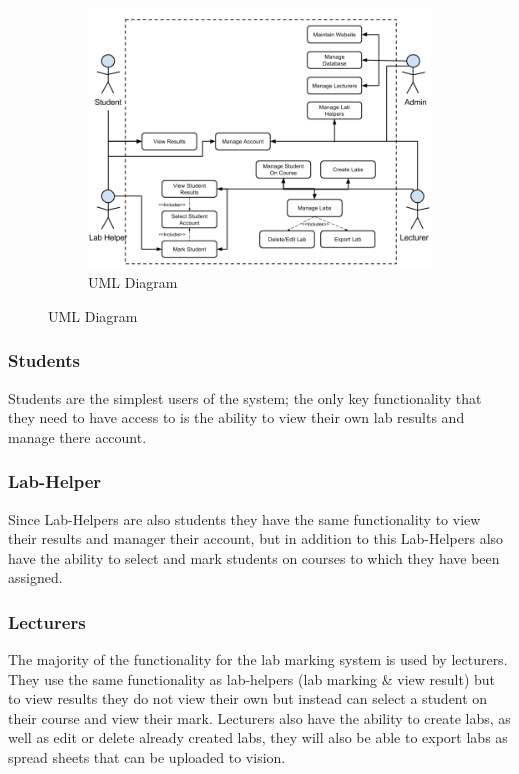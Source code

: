 \documentclass[12pt]{article}  %
\begin{document}
{

\newpage
\begin{figure}
\begin{figure}[H]
    \centering
    \includegraphics[width=1
    \textwidth]{images/design/Use-Case-Diagram.png}
    \caption{UML Diagram}
    \label{fig:uml}
\end{figure}
\end{figure}

\subsubsection*{Students}
Students are the simplest users of the system; the only key functionality that they need to have access to is the ability to view their own lab results and manage there account.


\subsubsection*{Lab-Helper}
Since Lab-Helpers are also students they have the same functionality to view their results and manager their account, but in addition to this Lab-Helpers also have the ability to select and mark students on courses to which they have been assigned.

} 


\subsubsection*{Lecturers}

The majority of the functionality for the lab marking system is used by lecturers. They use the same functionality as lab-helpers (lab marking \& view result) but to view results they do not view their own but instead can select a student on their course and view their mark. Lecturers also have the ability to create labs, as well as edit or delete already created labs, they will also be able to export labs as spread sheets that can be uploaded to vision.  
\end{document}
